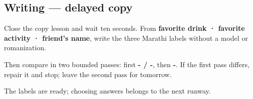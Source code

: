 \subsection*{Writing — delayed copy}
Close the copy lesson and wait ten seconds. From \textbf{favorite drink · favorite activity · friend's name}, write the three Marathi labels without a model or romanization.

Then compare in two bounded passes: first \textbf{- / -}, then \textbf{-}. If the first pass differs, repair it and stop; leave the second pass for tomorrow.

\begin{tcolorbox}[breakable,colback=teal!4,colframe=teal!35!black,title={Before you move on}]
The labels are ready; choosing answers belongs to the next runway.
\end{tcolorbox}
